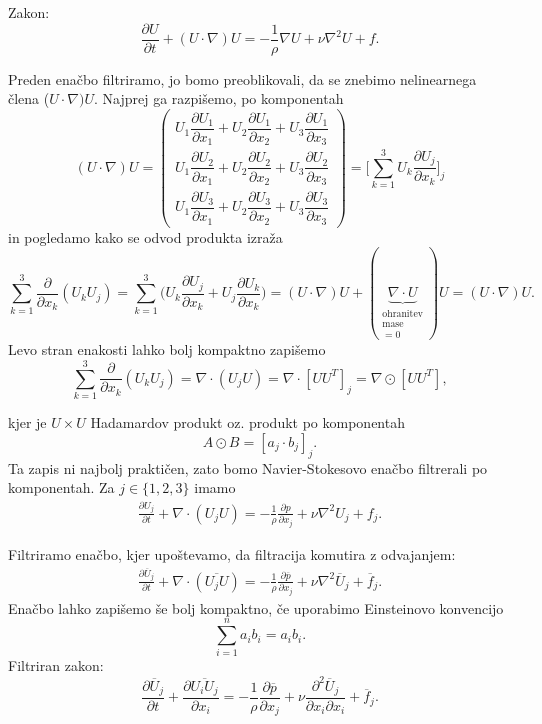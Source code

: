 \documentclass[mat2, tisk]{fmfdelo}
\begin{document}
Zakon: 
$$
\frac{\partial U}{\partial t} + (U\cdot \nabla)U = -\frac{1}{\rho} \nabla U + \nu\nabla^2 U + f.
$$

\noindent
Preden enačbo filtriramo, jo bomo preoblikovali, da se znebimo nelinearnega člena ($U\cdot \nabla)U$.
Najprej ga razpišemo, po komponentah 
\renewcommand{\arraystretch}{2.5} %
\[
(U \cdot \nabla) U =
\begin{pmatrix}
U_1 \dfrac{\partial U_1}{\partial x_1} + U_2 \dfrac{\partial U_1}{\partial x_2} + U_3 \dfrac{\partial U_1}{\partial x_3} \\
U_1 \dfrac{\partial U_2}{\partial x_1} + U_2 \dfrac{\partial U_2}{\partial x_2} + U_3 \dfrac{\partial U_2}{\partial x_3} \\
U_1 \dfrac{\partial U_3}{\partial x_1} + U_2 \dfrac{\partial U_3}{\partial x_2} + U_3 \dfrac{\partial U_3}{\partial x_3}
\end{pmatrix} = \Big[\sum_{k=1}^3 U_k \frac{\partial U_j}{\partial x_k}\Big]_j
\]
in pogledamo kako se odvod produkta izraža 
$$
\sum_{k=1}^3 \frac{\partial}{\partial x_k} (U_k U_j) = \sum_{k=1}^3 \Big(U_k\frac{\partial U_j}{\partial x_k}
+ U_j\frac{\partial U_k}{\partial x_k}\Big) = (U\cdot \nabla)U + (\underbrace{\nabla\cdot U}_{\substack{\text{ohranitev}\\{\text{mase}}\\=0}}) U
= (U\cdot \nabla)U.
$$
Levo stran enakosti lahko bolj kompaktno zapišemo
$$
\sum_{k=1}^3 \frac{\partial}{\partial x_k} (U_k U_j) = \nabla \cdot (U_j U) = 
\nabla \cdot [U U^T]_{j} = \nabla \odot [U U^T],
$$

kjer je $U\times U$ Hadamardov produkt oz. produkt po komponentah 
\[
A \odot B = \left[ a_j \cdot b_j \right]_j.
\]
Ta zapis ni najbolj praktičen, zato bomo Navier-Stokesovo enačbo filtrerali po komponentah.
Za $j\in \{1, 2, 3\}$ imamo 
\begin{align*}
\frac{\partial U_j}{\partial t} + \nabla\cdot(U_j U) = -\frac{1}{\rho} \frac{\partial p}{\partial x_j} + \nu\nabla^2 U_j + f_j.
\end{align*}

Filtriramo enačbo, kjer upoštevamo, da filtracija komutira z odvajanjem:
\begin{align*}
  \frac{\partial \overline{U}_j}{\partial t} + \nabla\cdot(\overline{U_j U}) = -\frac{1}{\rho} \frac{\partial \overline{p}}{\partial x_j} + \nu\nabla^2 \overline{U}_j + \overline{f}_j.
\end{align*}
Enačbo lahko zapišemo še bolj kompaktno, če uporabimo Einsteinovo konvencijo 
$$
\sum_{i=1}^n a_i b_i = a_i b_i.
$$
Filtriran zakon:
\begin{equation}
\frac{\partial \overline{U}_j}{\partial t} + \frac{\partial \overline{U_i U_j}}{\partial x_i} = -\frac{1}{\rho} \frac{\partial \overline{p}}{\partial x_j} + \nu \frac{\partial^2 \overline{U}_j}{\partial x_i \partial x_i} + \overline{f}_j.
\end{equation}
\end{document}
